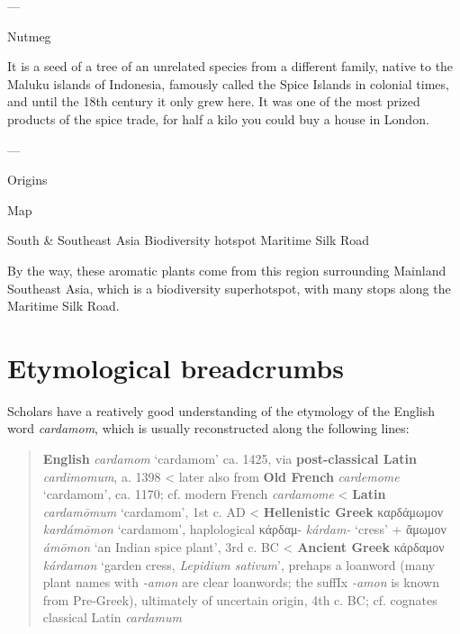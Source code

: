 \documentclass[12pt]{article}
\begin{document}
---

Nutmeg

It is a seed of a tree of an unrelated species from a different family, native to the Maluku islands of Indonesia, famously called the Spice Islands in colonial times, and until the 18th century it only grew here. It was one of the most prized products of the spice trade, for half a kilo you could buy a house in London. 


---

Origins

Map

South \& Southeast Asia
Biodiversity hotspot
Maritime Silk Road

By the way, these aromatic plants come from this region surrounding Mainland Southeast Asia, which is a biodiversity superhotspot, with many stops along the Maritime Silk Road.









\section{Etymological breadcrumbs}\label{sec:etymology}

Scholars have a reatively good understanding of the etymology of the English word \textit{cardamom}, which is usually reconstructed along the following lines:

\begin{quote}
    \textbf{English} \textit{cardamom} `cardamom' ca. 1425, via \textbf{post-classical Latin} \textit{cardimomum}, a. 1398
    < later also from \textbf{Old French} \textit{cardemome} `cardamom', ca. 1170; cf. modern French \textit{cardamome}
    < \textbf{Latin} \textit{cardamōmum} `cardamom', 1st c. AD
    < \textbf{Hellenistic Greek} {καρδάμωμον} \textit{kardámōmon} `cardamom', haplological κάρδαμ- \textit{kárdam-} `cress' + ἄμωμον \textit{ámōmon} `an Indian spice plant', 3rd c. BC
    < \textbf{Ancient Greek} {κάρδαμον} \textit{kárdamon} `garden cress, \textit{Lepidium sativum}', prehaps a loanword (many plant names with \textit{-amon} are clear loanwords; the suffIx \textit{-amon} is known from Pre-Greek), ultimately of uncertain origin, 4th c. BC; cf. cognates classical Latin \textit{cardamum}
    \parencites[s.v. cardamom]{oed}[s.v. cardamome]{tlfi}[s.v. cardamomum]{lewis_1879_latin}[s.v. καρδάμωμον]{liddell_1940_greekenglish}[s.v. κάρδαμον]{liddell_1940_greekenglish}[644]{beekes_2010_etymological}
\end{quote}
\end{document}
